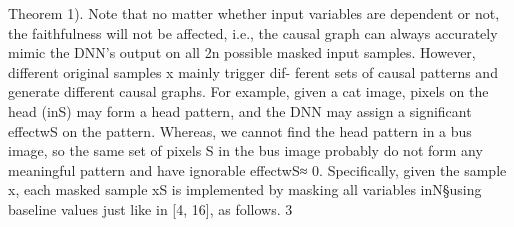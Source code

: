 Theorem 1). Note that no matter whether input variables are
dependent or not, the faithfulness will not be affected, i.e.,
the causal graph can always accurately mimic the DNN’s
output on all 2n possible masked input samples.
However, different original samples x mainly trigger dif-
ferent sets of causal patterns and generate different causal
graphs. For example, given a cat image, pixels on the head
(inS) may form a head pattern, and the DNN may assign
a signiﬁcant effectwS on the pattern. Whereas, we cannot
ﬁnd the head pattern in a bus image, so the same set of pixels
S in the bus image probably do not form any meaningful
pattern and have ignorable effectwS≈ 0.
Speciﬁcally, given the sample x, each masked sample
xS is implemented by masking all variables inN\S using
baseline values just like in [4, 16], as follows.
3
